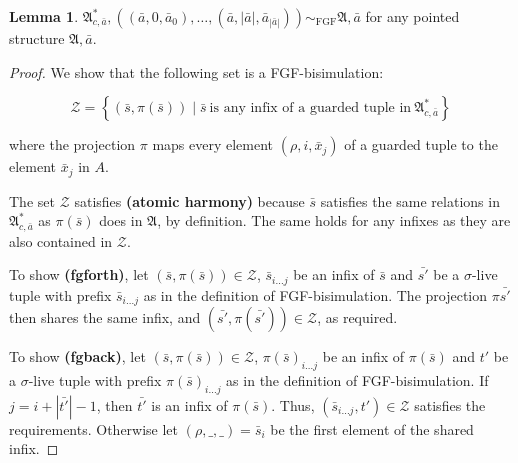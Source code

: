 \documentclass[draft]{scrartcl}
\theoremstyle{definition}
\newtheorem{definition}[theorem]{Definition}
\newtheorem{lemma}[theorem]{Lemma}
\begin{document}
\begin{lemma}
  $\mathfrak{A}^{*}_{c, \bar{a}}, ((\bar{a}, 0, \bar{a}_{0}), \ldots, (\bar{a}, |\bar{a}|, \bar{a}_{|\bar{a}|})) \sim_{\textrm{FGF}} \mathfrak{A}, \bar{a}$ for any pointed structure $\mathfrak{A}, \bar{a}$.
\end{lemma}

\begin{proof}
  We show that the following set is a FGF-bisimulation:

  \[
    \mathcal{Z} = \left\{
      (\bar{s}, \pi(\bar{s}))
      \mid \bar{s}\
      \textrm{is any infix of a guarded tuple in}\ \mathfrak{A}^{*}_{c, \bar{a}}
    \right\}
  \]

  where the projection $\pi$ maps every element $(\rho, i, \bar{x}_{j})$ of a guarded tuple to the element $\bar{x}_{j}$ in $A$.

  The set $\mathcal{Z}$ satisfies \textbf{(atomic harmony)} because $\bar{s}$ satisfies the same relations in $\mathfrak{A}^{*}_{c,\bar{a}}$ as $\pi(\bar{s})$ does in $\mathfrak{A}$, by definition.
  The same holds for any infixes as they are also contained in $\mathcal{Z}$.

  To show \textbf{(fgforth)}, let $(\bar{s}, \pi(\bar{s})) \in \mathcal{Z}$, $\bar{s}_{i\ldots{}j}$ be an infix of $\bar{s}$ and $\bar{s'}$ be a $\sigma$-live tuple with prefix $\bar{s}_{i\ldots{}j}$ as in the definition of FGF-bisimulation.
  The projection $\pi{\bar{s'}}$ then shares the same infix, and $(\bar{s'}, \pi(\bar{s'})) \in \mathcal{Z}$, as required.

  To show \textbf{(fgback)}, let $(\bar{s}, \pi(\bar{s})) \in \mathcal{Z}$, ${\pi(\bar{s})}_{i\ldots{}j}$ be an infix of $\pi(\bar{s})$ and $t'$ be a $\sigma$-live tuple with prefix ${\pi(\bar{s})}_{i\ldots{}j}$ as in the definition of FGF-bisimulation.
  If $j = i + |\bar{t'}| - 1$, then $\bar{t'}$ is an infix of $\pi(\bar{s})$.
  Thus, $(\bar{s}_{i\ldots{}j}, t') \in \mathcal{Z}$ satisfies the requirements.
  Otherwise let $(\rho, \_, \_) = \bar{s}_{i}$ be the first element of the shared infix.


\end{proof}


\end{document}
